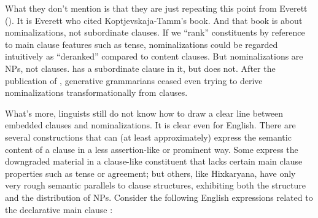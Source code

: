 \documentclass[output=paper,colorlinks,citecolor=brown
]{langscibook}
\begin{document}
What they don't mention is that they are just repeating this point
from Everett (\citeyear[629]{Everett05}). It is Everett who cited
Koptjevskaja-Tamm's book. And that book is about nominalizations, not
subordinate clauses. If we ``rank'' constituents by reference to main
clause features such as tense, nominalizations could be regarded
intuitively as ``deranked'' compared to content clauses. But
nominalizations are NPs, not clauses.  has a subordinate clause in it, but
 does
not. After the publication of \citet{Chomsky70}, generative
grammarians ceased even trying to derive nominalizations
transformationally from clauses.

What's more, linguists still do not know how to draw a clear line between
embedded clauses and nominalizations. It is clear even for English.
There are several constructions that can (at least approximately)
express the semantic content of a clause in a less assertion-like
or prominent way.
Some express the downgraded material in a clause-like constituent
that lacks certain main clause properties such as tense or agreement;
but others, like Hixkaryana, have only very rough semantic parallels
to clause structures, exhibiting both the structure and the distribution
of NPs.  Consider the following English expressions related to the
declarative main clause :
\end{document}
